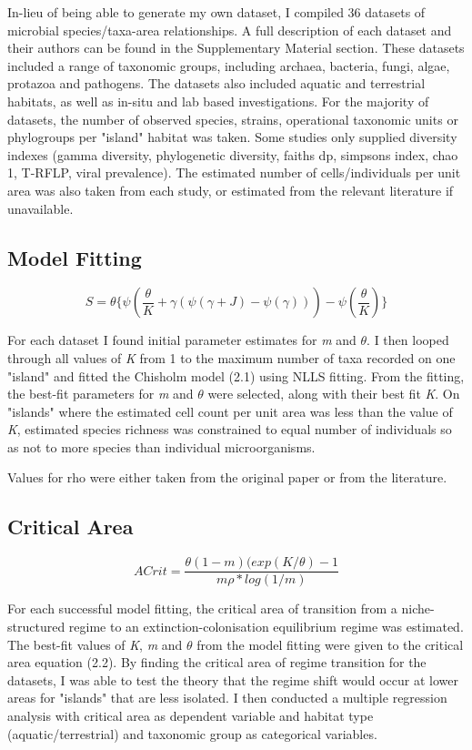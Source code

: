 In-lieu of being able to generate my own dataset, I compiled 36 datasets of microbial species/taxa-area relationships. A full description of each dataset and their authors can be found in the Supplementary Material section. These datasets included a range of taxonomic groups, including archaea, bacteria, fungi, algae, protazoa and pathogens. The datasets also included aquatic and terrestrial habitats, as well as in-situ and lab based investigations. For the majority of datasets, the number of observed species, strains, operational taxonomic units or phylogroups per "island" habitat was taken. Some studies only supplied diversity indexes (gamma diversity, phylogenetic diversity, faiths dp, simpsons index, chao 1, T-RFLP, viral prevalence). The estimated number of cells/individuals per unit area was also taken from each study, or estimated from the relevant literature if unavailable.     

\subsection{Model Fitting}

\begin{equation}
S=\theta\{\psi(\frac{\theta}{K}+\gamma(\psi(\gamma+J)-\psi(\gamma)))-\psi(\frac{\theta}{K})\}
\end{equation} 

For each dataset I found initial parameter estimates for \textit{m} and $\theta$. I then looped through all values of \textit{K} from 1 to the maximum number of taxa recorded on one "island" and fitted the Chisholm model (2.1) using NLLS fitting. From the fitting, the best-fit parameters for \textit{m} and $\theta$ were selected, along with their best fit \textit{K}. On "islands" where the estimated cell count per unit area was less than the value of \textit{K}, estimated species richness was constrained to equal number of individuals so as not to more species than individual microorganisms. %

Values for rho were either taken from the original paper or from the literature.

\subsection{Critical Area}

\begin{equation}
ACrit=\frac{\theta(1 - m)(exp(K/\theta) - 1}{m\rho*log(1/m)}
\end{equation}

For each successful model fitting, the critical area of transition from a niche-structured regime to an extinction-colonisation equilibrium regime was estimated. The best-fit values of \textit{K}, \textit{m} and $\theta$ from the model fitting were given to the critical area equation (2.2). By finding the critical area of regime transition for the datasets, I was able to test the theory that the regime shift would occur at lower areas for "islands" that are less isolated. I then conducted a multiple regression analysis with critical area as dependent variable and habitat type (aquatic/terrestrial) and taxonomic group as categorical variables. 
